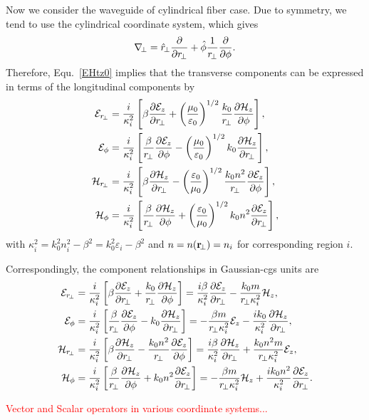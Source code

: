 Now we consider the waveguide of cylindrical fiber case. Due to symmetry, we tend to use the 
cylindrical coordinate system, which gives 
\begin{align}
\nabla\!_\perp = \hat{r}\!_\perp \frac{\partial {}}{\partial {r\!_\perp}} + \hat{\phi} \frac{1}{r\!_\perp} \frac{\partial {}}{\partial {\phi}}.
\end{align}
Therefore, Equ.~\ref{EHtz0} implies that the transverse components can be expressed in terms of the 
longitudinal components by
\begin{subequations}
\begin{align}
\mathcal{E}_{r\!_\perp} &= \frac{i}{\kappa_i^2} \left[ \beta \pp{\mathcal{E}_z }{r\!_\perp} + 
\left(\frac{\mu_0}{\varepsilon_0} \right)^{1/2}  \frac{k_0}{r\!_\perp} 
\pp{\mathcal{H}_z}{\phi} \right], \\
\mathcal{E}_\phi &= \frac{i}{\kappa_i^2} \left[\frac{\beta}{r\!_\perp} 
\pp{\mathcal{E}_z}{\phi} -\left(\frac{\mu_0}{\varepsilon_0} \right) ^{1/2} k_0 
\pp{\mathcal{H}_z}{r\!_\perp} 
\right],\\
\mathcal{H}_{r\!_\perp} &= \frac{i}{\kappa_i^2} \left[ \beta \pp{\mathcal{H}_z}{r\!_\perp} 
-\left(\frac{\varepsilon_0}{\mu_0} \right)^{1/2} \frac{k_0n^2}{r\!_\perp}\pp{\mathcal{E}_z}{\phi} \right],\\
\mathcal{H}_\phi &= \frac{i}{\kappa_i^2} \left[ \frac{\beta}{r\!_\perp} \pp{\mathcal{H}_z}{\phi} + 
\left(\frac{\varepsilon_0}{\mu_0} \right)^{1/2} k_0n^2 \pp{\mathcal{E}_z}{r\!_\perp} \right],
\end{align}
\end{subequations}
with $ \kappa_i^2= k_0^2n_i^2-\beta^2=k_0^2 \varepsilon_i -\beta^2  $ and $ n=n(\mathbf{r}\!_\perp)=n_i$ for corresponding region $i$. 

Correspondingly, the component relationships in Gaussian-cgs units are
\begin{subequations}\label{EHzgauss}
\begin{align}
\mathcal{E}_{r\!_\perp} &= \frac{i}{\kappa_i^2} \left[ \beta \pp{\mathcal{E}_z }{r\!_\perp} + 
  \frac{k_0}{r\!_\perp} 
\pp{\mathcal{H}_z}{\phi} \right]= \frac{i\beta}{\kappa_i^2} \pp{\mathcal{E}_z }{r\!_\perp} - 
  \frac{k_0m}{r\!_\perp \kappa_i^2} {\mathcal{H}_z}, \\
\mathcal{E}_\phi &= \frac{i}{\kappa_i^2} \left[\frac{\beta}{r\!_\perp} 
\pp{\mathcal{E}_z}{\phi} - k_0 
\pp{\mathcal{H}_z}{r\!_\perp} 
\right] = -\frac{\beta m}{r\!_\perp \kappa_i^2} 
{\mathcal{E}_z} - \frac{ik_0}{\kappa_i^2} 
\pp{\mathcal{H}_z}{r\!_\perp},\\
\mathcal{H}_{r\!_\perp} &= \frac{i}{\kappa_i^2} \left[ \beta \pp{\mathcal{H}_z}{r\!_\perp} 
- \frac{k_0n^2}{r\!_\perp}\pp{\mathcal{E}_z}{\phi} \right]= \frac{i\beta}{\kappa_i^2} \pp{\mathcal{H}_z}{r\!_\perp} 
+ \frac{k_0n^2m}{r\!_\perp \kappa_i^2} {\mathcal{E}_z},\\
\mathcal{H}_\phi &= \frac{i}{\kappa_i^2} \left[ \frac{\beta}{r\!_\perp} \pp{\mathcal{H}_z}{\phi} + 
 k_0n^2 \pp{\mathcal{E}_z}{r\!_\perp} \right] = -\frac{\beta m}{r\!_\perp \kappa_i^2} {\mathcal{H}_z} + 
  \frac{ik_0n^2}{\kappa_i^2} \pp{\mathcal{E}_z}{r\!_\perp}.
\end{align}
\end{subequations}


\textcolor{red}{Vector and Scalar operators in various coordinate systems...}

